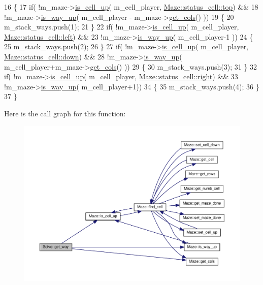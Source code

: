 \begin{DoxyCode}
16 \{
17     \textcolor{keywordflow}{if}( !m\_maze->\hyperlink{classMaze_a2b0e69e72d6c3e1037578f057946a21e}{is\_cell\_up}( m\_cell\_player, \hyperlink{classMaze_a07167e321eac2b67100fb82ecb98f1d1ab28354b543375bfa94dabaeda722927f}{Maze::status\_cell::top}) &&
18             !m\_maze->\hyperlink{classMaze_a308fa695665de6217c0e7f28aab5adda}{is\_way\_up}( m\_cell\_player -  m\_maze->\hyperlink{classMaze_a8a04cd1335e96a80358181afa164d4c9}{get\_cols}() ))
19     \{
20         m\_stack\_ways.push(1);
21     \}
22     \textcolor{keywordflow}{if}( !m\_maze->\hyperlink{classMaze_a2b0e69e72d6c3e1037578f057946a21e}{is\_cell\_up}( m\_cell\_player, \hyperlink{classMaze_a07167e321eac2b67100fb82ecb98f1d1a811882fecd5c7618d7099ebbd39ea254}{Maze::status\_cell::left}) &&
23             !m\_maze->\hyperlink{classMaze_a308fa695665de6217c0e7f28aab5adda}{is\_way\_up}( m\_cell\_player-1 ))
24     \{
25         m\_stack\_ways.push(2);
26     \}
27     \textcolor{keywordflow}{if}( !m\_maze->\hyperlink{classMaze_a2b0e69e72d6c3e1037578f057946a21e}{is\_cell\_up}( m\_cell\_player, \hyperlink{classMaze_a07167e321eac2b67100fb82ecb98f1d1a74e8333ad11685ff3bdae589c8f6e34d}{Maze::status\_cell::down}) &&
28             !m\_maze->\hyperlink{classMaze_a308fa695665de6217c0e7f28aab5adda}{is\_way\_up}( m\_cell\_player+m\_maze->\hyperlink{classMaze_a8a04cd1335e96a80358181afa164d4c9}{get\_cols}() ))
29     \{
30         m\_stack\_ways.push(3);
31     \}
32     \textcolor{keywordflow}{if}( !m\_maze->\hyperlink{classMaze_a2b0e69e72d6c3e1037578f057946a21e}{is\_cell\_up}( m\_cell\_player, \hyperlink{classMaze_a07167e321eac2b67100fb82ecb98f1d1a7c4f29407893c334a6cb7a87bf045c0d}{Maze::status\_cell::right}) &&
33             !m\_maze->\hyperlink{classMaze_a308fa695665de6217c0e7f28aab5adda}{is\_way\_up}( m\_cell\_player+1))
34     \{
35         m\_stack\_ways.push(4);
36     \}
37 \}
\end{DoxyCode}
Here is the call graph for this function\+:\nopagebreak
\begin{figure}[H]
\begin{center}
\leavevmode
\includegraphics[width=350pt]{classSolve_a963b593c0311f03c7e4ce77eea818fa1_cgraph}
\end{center}
\end{figure}

